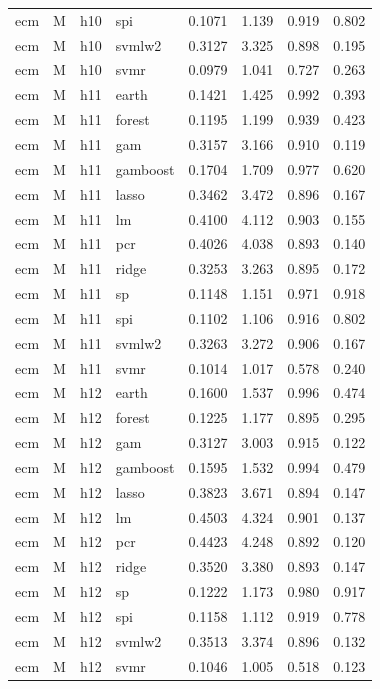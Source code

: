 \begin{ThreePartTable}
\begin{longtable}[t]{llclcccc}
ecm & M & h10 & spi & 0.1071 & 1.139 & 0.919 & 0.802\\
ecm & M & h10 & svmlw2 & 0.3127 & 3.325 & 0.898 & 0.195\\
ecm & M & h10 & svmr & 0.0979 & 1.041 & 0.727 & 0.263\\
\addlinespace
ecm & M & h11 & earth & 0.1421 & 1.425 & 0.992 & 0.393\\
ecm & M & h11 & forest & 0.1195 & 1.199 & 0.939 & 0.423\\
ecm & M & h11 & gam & 0.3157 & 3.166 & 0.910 & 0.119\\
ecm & M & h11 & gamboost & 0.1704 & 1.709 & 0.977 & 0.620\\
ecm & M & h11 & lasso & 0.3462 & 3.472 & 0.896 & 0.167\\
ecm & M & h11 & lm & 0.4100 & 4.112 & 0.903 & 0.155\\
ecm & M & h11 & pcr & 0.4026 & 4.038 & 0.893 & 0.140\\
ecm & M & h11 & ridge & 0.3253 & 3.263 & 0.895 & 0.172\\
ecm & M & h11 & sp & 0.1148 & 1.151 & 0.971 & 0.918\\
ecm & M & h11 & spi & 0.1102 & 1.106 & 0.916 & 0.802\\
ecm & M & h11 & svmlw2 & 0.3263 & 3.272 & 0.906 & 0.167\\
ecm & M & h11 & svmr & 0.1014 & 1.017 & 0.578 & 0.240\\
\addlinespace
ecm & M & h12 & earth & 0.1600 & 1.537 & 0.996 & 0.474\\
ecm & M & h12 & forest & 0.1225 & 1.177 & 0.895 & 0.295\\
ecm & M & h12 & gam & 0.3127 & 3.003 & 0.915 & 0.122\\
ecm & M & h12 & gamboost & 0.1595 & 1.532 & 0.994 & 0.479\\
ecm & M & h12 & lasso & 0.3823 & 3.671 & 0.894 & 0.147\\
ecm & M & h12 & lm & 0.4503 & 4.324 & 0.901 & 0.137\\
ecm & M & h12 & pcr & 0.4423 & 4.248 & 0.892 & 0.120\\
ecm & M & h12 & ridge & 0.3520 & 3.380 & 0.893 & 0.147\\
ecm & M & h12 & sp & 0.1222 & 1.173 & 0.980 & 0.917\\
ecm & M & h12 & spi & 0.1158 & 1.112 & 0.919 & 0.778\\
ecm & M & h12 & svmlw2 & 0.3513 & 3.374 & 0.896 & 0.132\\
ecm & M & h12 & svmr & 0.1046 & 1.005 & 0.518 & 0.123\\

\end{longtable}
\end{ThreePartTable}
